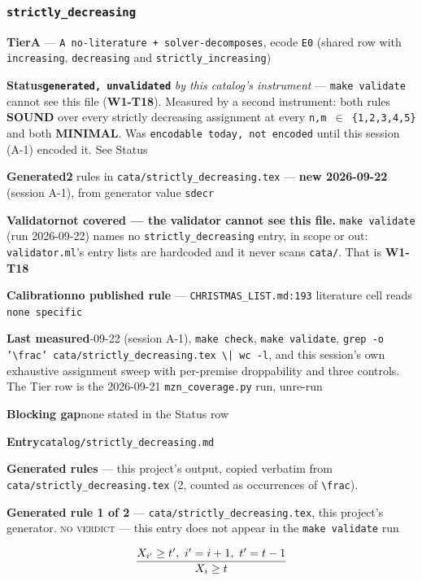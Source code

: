 \documentclass[10pt,a4paper]{article}
\newcommand{\entryfield}[2]{{\raggedright\textbf{#1}\quad #2\par}}
\newcommand{\rulebox}[1]{%
  \[\resizebox{\ifdim\width>\linewidth\linewidth\else\width\fi}{!}%
    {$\displaystyle #1$}\]}
\begin{document}
\subsubsection*{\texttt{strictly\_\allowbreak{}decreasing}}
\label{entry:strictly-decreasing}
\entryfield{Tier}{\textbf{A} --- \texttt{A no-\allowbreak{}literature + solver-\allowbreak{}decomposes}, ecode \texttt{E0} (shared row with \texttt{increasing}, \texttt{decreasing} and \texttt{strictly\_increasing})}
\entryfield{Status}{\textbf{\texttt{generated, unvalidated}} \emph{by this catalog's instrument} --- \texttt{make validate} cannot see this file (\textbf{W1-T18}). Measured by a second instrument: both rules \textbf{SOUND} over every strictly decreasing assignment at every \texttt{n,m $\in$ \{1,2,3,4,5\}} and both \textbf{MINIMAL}. Was \texttt{encodable today, not encoded} until this session (A-1) encoded it. See Status}
\entryfield{Generated}{\textbf{2} rules in \texttt{cata/\allowbreak{}strictly\_\allowbreak{}decreasing.\allowbreak{}tex} --- \textbf{new 2026-09-22} (session A-1), from generator value \texttt{sdecr}}
\entryfield{Validator}{\textbf{not covered --- the validator cannot see this file.} \texttt{make validate} (run 2026-09-22) names no \texttt{strictly\_decreasing} entry, in scope or out: \texttt{validator.ml}'s entry lists are hardcoded and it never scans \texttt{cata/}. That is \textbf{W1-T18}}
\entryfield{Calibration}{\textbf{no published rule} --- \texttt{CHRISTMAS\_LIST.md:193} literature cell reads \texttt{none specific}}
\entryfield{Last measured}{2026-09-22 (session A-1), \texttt{make check}, \texttt{make validate}, \texttt{grep -\allowbreak{}o '\textbackslash{}frac' cata/\allowbreak{}strictly\_\allowbreak{}decreasing.\allowbreak{}tex \textbackslash{}| wc -\allowbreak{}l}, and this session's own exhaustive assignment sweep with per-premise droppability and three controls. The Tier row is the 2026-09-21 \texttt{mzn\_coverage.py} run, unre-run}
\entryfield{Blocking gap}{none stated in the Status row}
\entryfield{Entry}{\texttt{catalog/strictly\_decreasing.md}}

\textbf{Generated rules} --- this project's output, copied verbatim from \texttt{cata/strictly\_decreasing.tex} (2, counted as occurrences of \texttt{\textbackslash{}frac}).\par

{\small\textbf{Generated rule 1 of 2} --- \texttt{cata/strictly\_decreasing.tex}, this project's generator. \textsc{no verdict} --- this entry does not appear in the \texttt{make validate} run\par}
\rulebox{\frac{X_{i'} \geq t',~i'=i+1,~t'=t-1}{X_{i} \geq t}}
\end{document}
